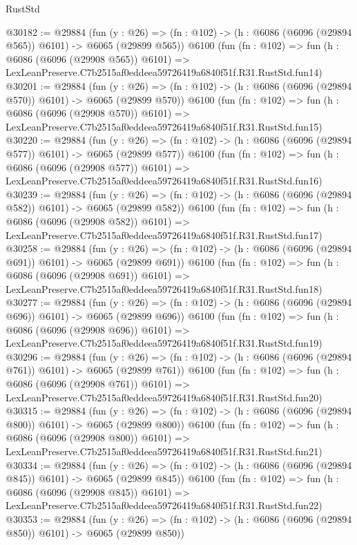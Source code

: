 \begin{lexlean}{RustStd}
\begin{coremodule}
@30182 := @29884
    (fun (y : @26) => (fn : @102) -> (h : @6086 (@6096 (@29894 @565)) @6101) -> @6065 (@29899 @565))
    @6100
    (fun (fn : @102) =>
    fun (h : @6086 (@6096 (@29908 @565)) @6101) =>
    LexLeanPreserve.C7b2515af0eddeea59726419a6840f51f.R31.RustStd.fun14)
@30201 := @29884
    (fun (y : @26) => (fn : @102) -> (h : @6086 (@6096 (@29894 @570)) @6101) -> @6065 (@29899 @570))
    @6100
    (fun (fn : @102) =>
    fun (h : @6086 (@6096 (@29908 @570)) @6101) =>
    LexLeanPreserve.C7b2515af0eddeea59726419a6840f51f.R31.RustStd.fun15)
@30220 := @29884
    (fun (y : @26) => (fn : @102) -> (h : @6086 (@6096 (@29894 @577)) @6101) -> @6065 (@29899 @577))
    @6100
    (fun (fn : @102) =>
    fun (h : @6086 (@6096 (@29908 @577)) @6101) =>
    LexLeanPreserve.C7b2515af0eddeea59726419a6840f51f.R31.RustStd.fun16)
@30239 := @29884
    (fun (y : @26) => (fn : @102) -> (h : @6086 (@6096 (@29894 @582)) @6101) -> @6065 (@29899 @582))
    @6100
    (fun (fn : @102) =>
    fun (h : @6086 (@6096 (@29908 @582)) @6101) =>
    LexLeanPreserve.C7b2515af0eddeea59726419a6840f51f.R31.RustStd.fun17)
@30258 := @29884
    (fun (y : @26) => (fn : @102) -> (h : @6086 (@6096 (@29894 @691)) @6101) -> @6065 (@29899 @691))
    @6100
    (fun (fn : @102) =>
    fun (h : @6086 (@6096 (@29908 @691)) @6101) =>
    LexLeanPreserve.C7b2515af0eddeea59726419a6840f51f.R31.RustStd.fun18)
@30277 := @29884
    (fun (y : @26) => (fn : @102) -> (h : @6086 (@6096 (@29894 @696)) @6101) -> @6065 (@29899 @696))
    @6100
    (fun (fn : @102) =>
    fun (h : @6086 (@6096 (@29908 @696)) @6101) =>
    LexLeanPreserve.C7b2515af0eddeea59726419a6840f51f.R31.RustStd.fun19)
@30296 := @29884
    (fun (y : @26) => (fn : @102) -> (h : @6086 (@6096 (@29894 @761)) @6101) -> @6065 (@29899 @761))
    @6100
    (fun (fn : @102) =>
    fun (h : @6086 (@6096 (@29908 @761)) @6101) =>
    LexLeanPreserve.C7b2515af0eddeea59726419a6840f51f.R31.RustStd.fun20)
@30315 := @29884
    (fun (y : @26) => (fn : @102) -> (h : @6086 (@6096 (@29894 @800)) @6101) -> @6065 (@29899 @800))
    @6100
    (fun (fn : @102) =>
    fun (h : @6086 (@6096 (@29908 @800)) @6101) =>
    LexLeanPreserve.C7b2515af0eddeea59726419a6840f51f.R31.RustStd.fun21)
@30334 := @29884
    (fun (y : @26) => (fn : @102) -> (h : @6086 (@6096 (@29894 @845)) @6101) -> @6065 (@29899 @845))
    @6100
    (fun (fn : @102) =>
    fun (h : @6086 (@6096 (@29908 @845)) @6101) =>
    LexLeanPreserve.C7b2515af0eddeea59726419a6840f51f.R31.RustStd.fun22)
@30353 := @29884
    (fun (y : @26) => (fn : @102) -> (h : @6086 (@6096 (@29894 @850)) @6101) -> @6065 (@29899 @850))

\end{coremodule}
\end{lexlean}
